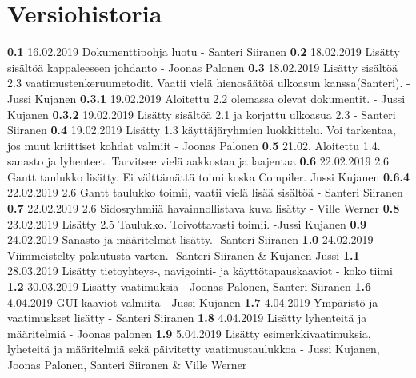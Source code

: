 \chapter*{Versiohistoria}

\newcommand{\currentversion}{1.9} %

\textbf{0.1} 16.02.2019 Dokumenttipohja luotu - Santeri Siiranen \newline
\textbf{0.2} 18.02.2019 Lisätty sisältöä kappaleeseen johdanto - Joonas Palonen \newline
\textbf{0.3} 18.02.2019 Lisätty sisältöä 2.3 vaatimustenkeruumetodit. Vaatii vielä hienosäätöä ulkoasun kanssa(Santeri). - Jussi Kujanen \newline
\textbf{0.3.1} 19.02.2019 Aloitettu 2.2 olemassa olevat dokumentit. - Jussi Kujanen \newline
\textbf{0.3.2} 19.02.2019 Lisätty sisältöä 2.1 ja korjattu ulkoasua 2.3 - Santeri Siiranen \newline
\textbf{0.4} 19.02.2019 Lisätty 1.3 käyttäjäryhmien luokkittelu. Voi tarkentaa, jos muut kriittiset kohdat valmiit - Joonas Palonen \newline
\textbf{0.5} 21.02. Aloitettu 1.4. sanasto ja lyhenteet. Tarvitsee vielä aakkostaa ja laajentaa \newline
\textbf{0.6} 22.02.2019 2.6 Gantt taulukko lisätty. Ei välttämättä toimi koska Compiler. Jussi Kujanen \newline
\textbf{0.6.4} 22.02.2019 2.6 Gantt taulukko toimii, vaatii vielä lisää sisältöä - Santeri Siiranen \newline
\textbf{0.7} 22.02.2019 2.6 Sidosryhmiiä havainnollistava kuva lisätty - Ville Werner \newline
\textbf{0.8} 23.02.2019 Lisätty 2.5 Taulukko. Toivottavasti toimii. -Jussi Kujanen \newline
\textbf{0.9} 24.02.2019 Sanasto ja määritelmät lisätty. -Santeri Siiranen \newline
\textbf{1.0} 24.02.2019 Viimmeistelty palautusta varten. -Santeri Siiranen \& Kujanen Jussi \newline 
\textbf{1.1} 28.03.2019 Lisätty tietoyhteys-, navigointi- ja käyttötapauskaaviot - koko tiimi \newline
\textbf{1.2} 30.03.2019 Lisätty vaatimuksia - Joonas Palonen, Santeri Siiranen\newline 
\textbf{1.6} 4.04.2019 GUI-kaaviot valmiita - Jussi Kujanen\newline 
\textbf{1.7} 4.04.2019 Ympäristö ja vaatimuskset lisätty - Santeri Siiranen\newline 
\textbf{1.8} 4.04.2019 Lisätty lyhenteitä ja määritelmiä - Joonas palonen\newline 
\textbf{1.9} 5.04.2019 Lisätty esimerkkivaatimuksia, lyheteitä ja määritelmiä sekä päivitetty vaatimustaulukkoa - Jussi Kujanen, Joonas Palonen, Santeri Siiranen \& Ville Werner \newline 
